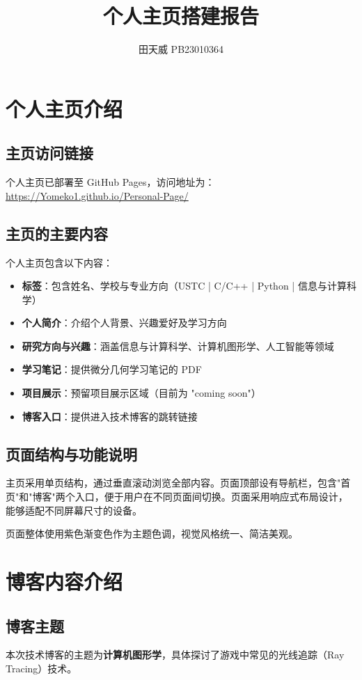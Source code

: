 \documentclass[UTF8]{article}
\title{个人主页搭建报告}
\author{田天威 PB23010364}
\date{}
\begin{document}
\maketitle

\section{个人主页介绍}

\subsection{主页访问链接}
个人主页已部署至 GitHub Pages，访问地址为：\url{https://Yomeko1.github.io/Personal-Page/}

\subsection{主页的主要内容}
个人主页包含以下内容：
\begin{itemize}
    \item \textbf{标签}：包含姓名、学校与专业方向（USTC | C/C++ | Python | 信息与计算科学）
    \item \textbf{个人简介}：介绍个人背景、兴趣爱好及学习方向
    \item \textbf{研究方向与兴趣}：涵盖信息与计算科学、计算机图形学、人工智能等领域
    \item \textbf{学习笔记}：提供微分几何学习笔记的 PDF 
    \item \textbf{项目展示}：预留项目展示区域（目前为 "coming soon"）
    \item \textbf{博客入口}：提供进入技术博客的跳转链接
\end{itemize}

\subsection{页面结构与功能说明}
主页采用单页结构，通过垂直滚动浏览全部内容。页面顶部设有导航栏，包含"首页"和"博客"两个入口，便于用户在不同页面间切换。页面采用响应式布局设计，能够适配不同屏幕尺寸的设备。

页面整体使用紫色渐变色作为主题色调，视觉风格统一、简洁美观。

\section{博客内容介绍}

\subsection{博客主题}
本次技术博客的主题为\textbf{计算机图形学}，具体探讨了游戏中常见的光线追踪（Ray Tracing）技术。
\end{document}
